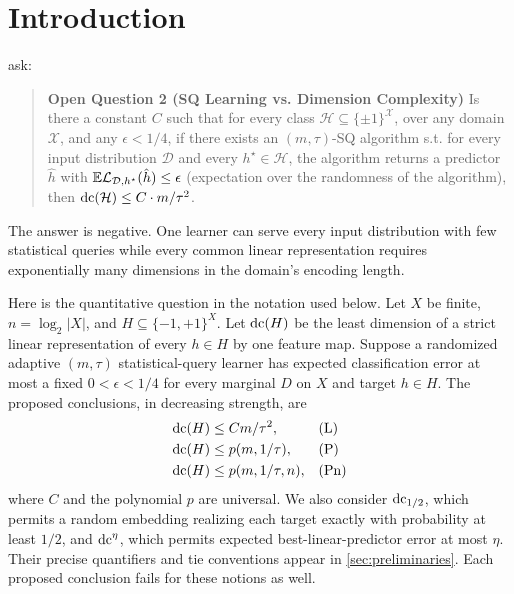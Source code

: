 \section{Introduction}\label{sec:introduction}
\citet[Open Question 2]{FKS26} ask:
\begin{quote}\small
\textbf{Open Question 2 (SQ Learning vs. Dimension Complexity)}
Is there a constant $C$ such that for every class $\mathcal H\subseteq\{\pm1\}^{\mathcal X}$, over any domain $\mathcal X$, and any $\epsilon<1/4$, if there exists an $(m,\tau)$-SQ algorithm s.t. for every input distribution $\mathcal D$ and every $h^\star\in\mathcal H$, the algorithm returns a predictor $\hat h$ with $\mathbb E\mathcal L_{\mathcal D,h^\star}(\hat h)\le\epsilon$ (expectation over the randomness of the algorithm), then $\operatorname{dc}(\mathcal H)\le C\cdot m/\tau^2$.
\end{quote}
The answer is negative. One learner can serve every input distribution with few statistical queries while every common linear representation requires exponentially many dimensions in the domain's encoding length.

Here is the quantitative question in the notation used below. Let $X$ be finite, $n=\log_2|X|$, and $H\subseteq\{-1,+1\}^X$. Let $\operatorname{dc}(H)$ be the least dimension of a strict linear representation of every $h\in H$ by one feature map. Suppose a randomized adaptive $(m,\tau)$ statistical-query learner has expected classification error at most a fixed $0<\epsilon<1/4$ for every marginal $D$ on $X$ and target $h\in H$. The proposed conclusions, in decreasing strength, are
\begin{align}
\operatorname{dc}(H)&\le C m/\tau^2, &&\text{(L)}\label{eq:linear-question}\\
\operatorname{dc}(H)&\le p(m,1/\tau), &&\text{(P)}\label{eq:poly-question}\\
\operatorname{dc}(H)&\le p(m,1/\tau,n), &&\text{(Pn)}\label{eq:polyn-question}
\end{align}
where $C$ and the polynomial $p$ are universal. We also consider $\operatorname{dc}_{1/2}$, which permits a random embedding realizing each target exactly with probability at least $1/2$, and $\operatorname{dc}^\eta$, which permits expected best-linear-predictor error at most $\eta$. Their precise quantifiers and tie conventions appear in \cref{sec:preliminaries}. Each proposed conclusion fails for these notions as well.

